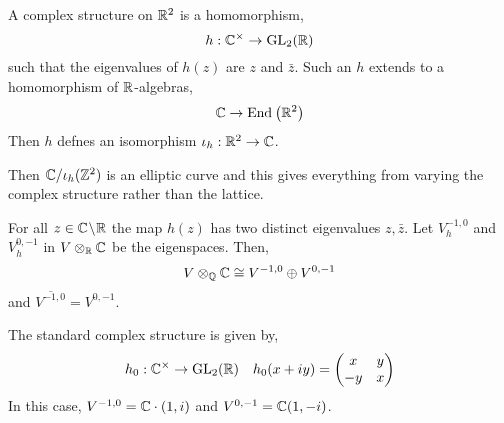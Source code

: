 \documentclass[12pt]{article}
\begin{document}
\begin{defn}
A complex structure on $\mathbb{R}^2$ is a homomorphism,
\[ h : \mathbb{C}^\times \to \mathrm{GL}_2(\mathbb{R}) \]
such that the eigenvalues of $h(z)$ are $z$ and $\bar{z}$. Such an $h$ extends to a homomorphism of $\mathbb{R}$-algebras,
\[ \mathbb{C} \to \mathrm{End}_{} \left( \mathbb{R}^2 \right) \]
Then $h$ defnes an isomorphism $\iota_h : \mathbb{R}^2 \to \mathbb{C}$. 
\end{defn}

\begin{rmk}
Then $\mathbb{C} / \iota_h(\mathbb{Z}^2)$ is an elliptic curve and this gives everything from varying the complex structure rather than the lattice. 
\end{rmk}

For all $z \in \mathbb{C} \! \setminus \! \mathbb{R}$ the map $h(z)$ has two distinct eigenvalues $z, \bar{z}$. Let $V^{-1,0}_h$ and $V^{0,-1}_h$ in $V \otimes_{\mathbb{R}} \mathbb{C}$ be the eigenspaces. Then,
\[ V \otimes_{\mathbb{Q}} \mathbb{C} \cong V^{-1,0} \oplus V^{0, -1} \]
and $\overline{V^{-1,0}} = V^{0,-1}$.

\begin{rmk}
The standard complex structure is given by,
\[ h_0 : \mathbb{C}^\times \to \mathrm{GL}_2(\mathbb{R}) \quad h_0(x+iy) = 
\begin{pmatrix}
x & y
\\
-y & x
\end{pmatrix} \]
In this case, $V^{-1,0} = \mathbb{C} \cdot (1,i)$ and $V^{0,-1} = \mathbb{C} (1, -i)$.
\end{rmk}
\end{document}
